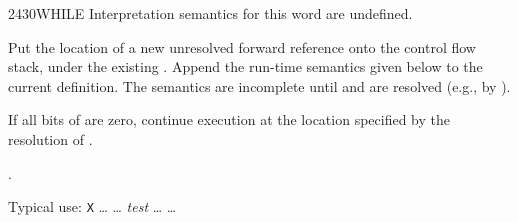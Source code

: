 \begin{worddef}{2430}{WHILE}
\interpret
	Interpretation semantics for this word are undefined.

\compile

	Put the location of a new unresolved forward reference
	 onto the control flow stack, under the existing
	. Append the run-time semantics given below to the
	current definition. The semantics are incomplete until
	 and  are resolved (e.g., by
	).

\runtime

	If all bits of  are zero, continue execution at the
	location specified by the resolution of .

\see {}.

	\begin{rationale} %
		Typical use:
			\word{:} \texttt{X} {\ldots}
				 {\ldots}
				\emph{test} 
				{\ldots} 
			{\ldots} \word{;}
	\end{rationale}

	\begin{testing} %
		 \\
		 \\
		 \\
		 \\

		 \\
		 \\
		 \\
		 \\
		 \\
	\end{testing}
\end{worddef}


